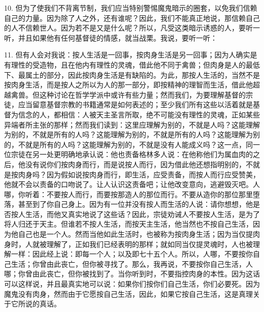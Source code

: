 10. 但为了使我们不背离节制，我们应当特别警惕魔鬼暗示的圈套，以免我们信赖自己的力量。因为除了人之外，还有谁呢？因此，我们不能真正地说，那信赖自己的人不信赖世人。因为若不是又是什么呢？所以，凡受这类暗示诱惑的人，要听一听，并且如果他有任何基督徒的情感，就当战栗。我说，要听一听：\par

11. 但有人会对我说：按人生活是一回事，按肉身生活是另一回事；因为人确实是有理性的受造物，且在他内有理性的灵魂，借此他不同于禽兽；但肉身是人的最低下、最属土的部分，因此按肉身生活是有缺陷的。为此，那按人生活的，当然不是按肉身生活，而是按人之所以为人的那一部分，即按精神的理智而生活，借此他超越禽兽。但这种讨论在哲学学派中或许有些力量；然而我们，为要理解基督的宗徒，应当留意基督宗教的书籍通常是如何表述的；至少我们所有这些以活着就是基督为信念的人，都相信：人被天主圣言所取，绝不可能没有理性的灵魂，正如某些异端者所主张的那样；然而我们读到：这里应理解为别的，不就是人吗？这能理解为别的，不就是所有的人吗？这能理解为别的，不就是所有的人吗？这能理解为别的，不就是所有的人吗？这能理解为别的，不就是没有人能成义吗？这一点，同一位宗徒在另一处更明确地承认说：他也责备格林多人说：在他称他们为属血肉的之后，他没有说你们按肉身而行，而是说按人而行，因为借此他还想指明别的，不就是按肉身吗？因为假如说按肉身而行，即生活，应受责备，而按人而行应受赞美，他就不会以责备的口吻说了。让人认识这责备吧；让他改变意向，逃避毁灭吧。人哪，你听着：不要按人而行，而要按那造人的那位而行。不要从造你的那位那里堕落，甚至到了你自己身上。因为有一位并没有按人而生活的人说：请你想想，他是否按人生活，而他又真实地说了这些话？因此，宗徒劝诫人不要按人生活，是为了将人归还于天主。但谁若不按人生活，而按天主生活，他当然也不按自己生活，因为他自己也是一个人。然而当他如此生活时，也被称为按肉身生活；因为当仅提肉身时，人就被理解了，正如我们已经表明的那样；就如同当仅提灵魂时，人也被理解一样：因此经上说：即每一个人；以及即七十五个人。所以，人哪，不要按你自己生活；你曾由此丧亡，但你被寻找了。那么，我再说，不要按你自己生活，人哪；你曾由此丧亡，但你被找到了。当你听到时，不要指控肉身的本性。因为这话可以这样说，并且最真实地可以说：如果你们按你们自己生活，你们必要死。因为魔鬼没有肉身，然而由于它愿按自己生活，因此，如果它按自己生活，这是真理关于它所说的真话。\par

